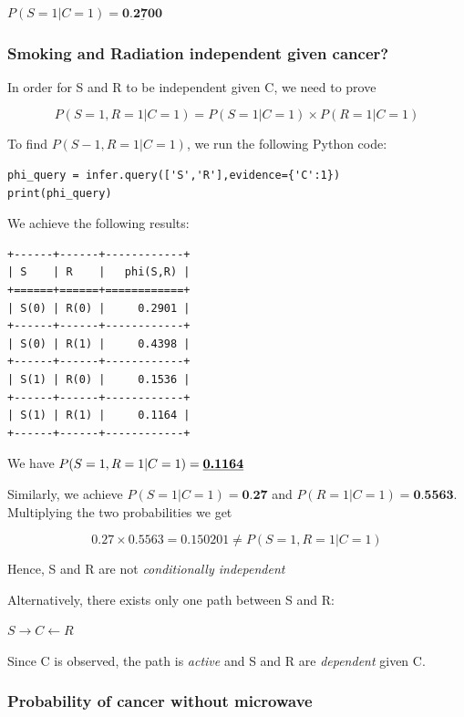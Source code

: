 \documentclass[12pt, letterpaper]{article}
\begin{document}
$P(S=1|C=1)=\underline{\textbf{0.2700}}$

\subsubsection{Smoking and Radiation independent given cancer?}
In order for S and R to be independent given C, we need to prove

\[P(S=1,R=1|C=1)=P(S=1|C=1)\times P(R=1|C=1)\]

To find $P(S-1,R=1|C=1)$, we run the following Python code:

\begin{mdframed}[backgroundcolor=bg]
\begin{verbatim}
phi_query = infer.query(['S','R'],evidence={'C':1})
print(phi_query)
\end{verbatim}
\end{mdframed}

We achieve the following results:

\begin{mdframed}[backgroundcolor=bg]
\begin{lstlisting}
+------+------+------------+
| S    | R    |   phi(S,R) |
+======+======+============+
| S(0) | R(0) |     0.2901 |
+------+------+------------+
| S(0) | R(1) |     0.4398 |
+------+------+------------+
| S(1) | R(0) |     0.1536 |
+------+------+------------+
| S(1) | R(1) |     0.1164 |
+------+------+------------+
\end{lstlisting}
\end{mdframed}

We have $P(S=1,R=1|C=1)=\textbf{\underline{0.1164}}$

Similarly, we achieve $P(S=1|C=1)=\textbf{0.27}$ and $P(R=1|C=1)=\textbf{0.5563}$. Multiplying the two probabilities we get

\[0.27\times 0.5563=0.150201\neq P(S=1,R=1|C=1)\]

Hence, S and R are not \textit{conditionally independent}

Alternatively, there exists only one path between S and R:

$S\rightarrow C\leftarrow R$

Since C is observed, the path is \textit{active} and S and R are \textit{dependent} given C.

\subsubsection{Probability of cancer without microwave}
\end{document}
